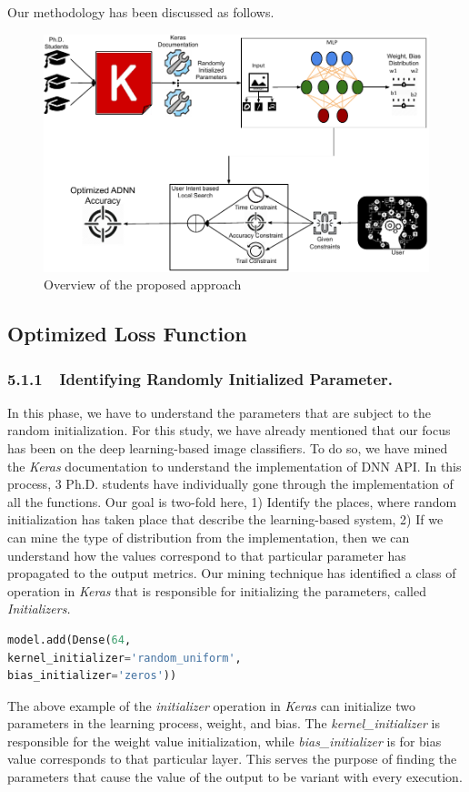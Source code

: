 Our methodology has been discussed as follows.
\begin{figure}
	\includegraphics[width=0.95\linewidth]{approach.pdf}
	\centering
	\caption{Overview of the proposed approach}
	\label{fig:flow}
	\vspace{15pt}
\end{figure}
\subsection{Optimized Loss Function}
\subsubsection{5.1.1~~Identifying Randomly Initialized Parameter.}

In this phase, we have to understand the parameters that are subject to the random initialization. For this study, we have already mentioned that our focus has been on the deep learning-based image classifiers. To do so, we have mined the \emph{Keras} \cite{chollet2015keras} documentation to understand the implementation of DNN API. In this process, 3 Ph.D. students have individually gone through the implementation of all the functions. Our goal is two-fold here, 1) Identify the places, where random initialization has taken place that describe the learning-based system, 2) If we can mine the type of distribution from the implementation, then we can understand how the values correspond to that particular parameter has propagated to the output metrics. Our mining technique has identified a class of operation in \emph{Keras} that is responsible for initializing the parameters, called \emph{Initializers.} 
\begin{lstlisting}[language=Python, caption=Example of initialization parameters in Keras]
model.add(Dense(64,
kernel_initializer='random_uniform',
bias_initializer='zeros'))
\end{lstlisting}
The above example of the \emph{initializer} operation in \emph{Keras} can initialize two parameters in the learning process, weight, and bias. The \emph{kernel\_initializer} is responsible for the weight value initialization, while \emph{bias\_initializer} is for bias value corresponds to that particular layer. This serves the purpose of finding the parameters that cause the value of the output to be variant with every execution. 

